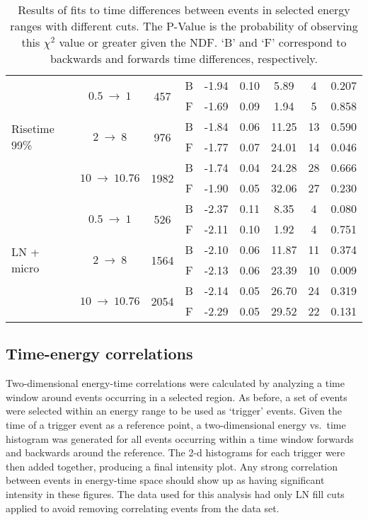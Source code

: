 \begin{table}
\begin{tabular}{l  c  c  c  r@{$~\pm~$}l  c  c  c }
				\multirow{6}{*}{Risetime 99\%}& \multirow{2}{*}{$0.5~\to~1$} & \multirow{2}{*}{457}	& B & -1.94 & 0.10 & 5.89 & 4 & 0.207\\
					& & & F & -1.69 & 0.09 & 1.94 & 5 & 0.858\\
				& \multirow{2}{*}{$2~\to~8$} & \multirow{2}{*}{976}	& B & -1.84 & 0.06 & 11.25 & 13 & 0.590\\
					& & & F & -1.77 & 0.07 & 24.01 & 14 & 0.046\\
				& \multirow{2}{*}{$10~\to~10.76$} & \multirow{2}{*}{1982}	& B & -1.74 & 0.04 & 24.28 & 28 & 0.666\\
					& & & F & -1.90 & 0.05 & 32.06 & 27 & 0.230\\
				\hline
				
				\multirow{6}{*}{LN + micro}& \multirow{2}{*}{$0.5~\to~1$} & \multirow{2}{*}{526}	& B & -2.37 & 0.11 & 8.35 & 4 & 0.080\\
					& & & F & -2.11 & 0.10 & 1.92 & 4 & 0.751\\
				& \multirow{2}{*}{$2~\to~8$} & \multirow{2}{*}{1564}	& B & -2.10 & 0.06 & 11.87 & 11 & 0.374\\
					& & & F & -2.13 & 0.06 & 23.39 & 10 & 0.009\\
				& \multirow{2}{*}{$10~\to~10.76$} & \multirow{2}{*}{2054}	& B & -2.14 & 0.05 & 26.70 & 24 & 0.319\\
					& & & F & -2.29 & 0.05 & 29.52 & 22 & 0.131\\
				\hline
				
					\hline
				\end{tabular}


				\caption[Results of fits to time differences for events in selected energy ranges with different cuts]
				{Results of fits to time differences between events in selected energy ranges with different cuts.  
				The P-Value is the probability of observing this $\chi^{2}$ value or greater given the NDF. `B' and `F' correspond to backwards
				and forwards time differences, respectively.}
				\label{tab:BeGeForBackTable}			
			\end{table}

		\subsection{Time-energy correlations}
		\label{sec:BeGeTimeEnergyCor}

	Two-dimensional energy-time correlations were calculated by analyzing a time window around events occurring in a selected region.  As before, a set of events were selected within an energy range to be used as `trigger' events.  Given the time of a trigger event as a reference point, a two-dimensional energy vs.~time histogram was generated for all events occurring within a time window forwards and backwards around the reference.  The 2-d histograms for each trigger were then added together, producing a final intensity plot.  Any strong correlation between events in energy-time space should show up as having significant intensity in these figures.  The data used for this analysis had only LN fill cuts applied to avoid removing correlating events from the data set.
	
